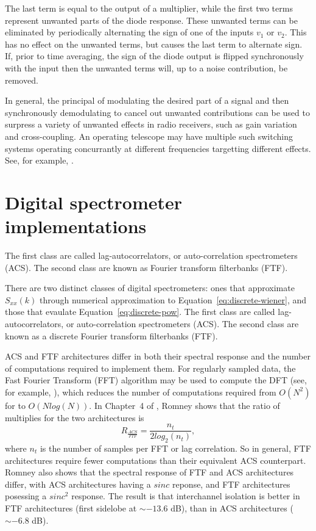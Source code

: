 \documentclass{ws-rv961x669}
\begin{document}
The last term is equal to the output of a multiplier, while the first two terms represent unwanted parts of the diode response. These unwanted terms can be eliminated by periodically alternating the sign of one of the inputs $v_1$ or $v_2$. This has no effect on the unwanted terms, but causes the last term to alternate sign. If, prior to time averaging, the sign of the diode output is flipped synchronously with the input then the unwanted terms will, up to a noise contribution, be removed.

In general, the principal of modulating the desired part of a signal and then synchronously demodulating to cancel out unwanted contributions can be used to surpress a variety of unwanted effects in radio receivers, such as gain variation and cross-coupling. An operating telescope may have multiple such switching systems operating concurrantly at different frequencies targetting different effects. See, for example, \cite{Erickson2007}. 

\section{Digital spectrometer implementations}

The first class are called lag-autocorrelators, or auto-correlation spectrometers (ACS). The second class are known as Fourier transform filterbanks (FTF).

There are two distinct classes of digital spectrometers: ones that approximate $S_{xx}(k)$ through numerical approximation to Equation~\ref{eq:discrete-wiener}, and those that evaulate Equation~\ref{eq:discrete-pow}. The first class are called lag-autocorrelators, or auto-correlation spectrometers (ACS). The second class are known as a discrete Fourier transform filterbanks (FTF).  

ACS and FTF architectures differ in both their spectral response and
the number of computations required to implement them. For regularly
sampled data, the Fast Fourier Transform (FFT) algorithm may be used
to compute the DFT (see, for example, \citep{BookBrighamFFT}),
which reduces the number of computations required from $O(N^{2})$
for to $O(Nlog(N))$. In Chapter~4 of \citep{Taylor1999}, Romney
shows that the ratio of multiplies for the two architectures is
\begin{equation}
R_{\frac{ACS}{FTF}}=\frac{n_{t}}{\mbox{2}log_{2}(n_{t})},
\end{equation}
where $n_{t}$ is the number of samples per FFT or lag correlation.
So in general, FTF architectures require fewer computations than their
equivalent ACS counterpart. Romney also shows that the spectral response
of FTF and ACS architectures differ, with ACS architectures having
a $sinc$ reponse, and FTF architectures posessing a $sinc^{2}$ response.
The result is that interchannel isolation is better in FTF architectures
(first sidelobe at $\sim-\mbox{13.6}$ dB), than in ACS architectures
($\sim-\mbox{6.8}$ dB). 
\end{document}
